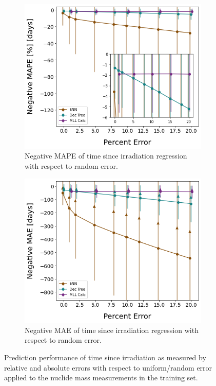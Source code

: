 \begin{figure}[!htb]
  \centering
  \begin{subfigure}[b]{0.49\textwidth}
    \centering
    \includegraphics[width=\textwidth]{./chapters/exp1/randerr_compare_nuc29_MAPE_cool.png}
    \caption{Negative \gls{MAPE} of time since irradiation regression with 
             respect to random error.} 
    \label{fig:coolmape}
  \end{subfigure}
  \hfill
  \begin{subfigure}[b]{0.49\textwidth}
    \centering
    \includegraphics[width=\textwidth]{./chapters/exp1/randerr_compare_nuc29_MAE_cool.png}
    \caption{Negative \gls{MAE} of time since irradiation regression with 
             respect to random error.} 
    \label{fig:coolmae}
  \end{subfigure}
  \caption[Prediction performance of time since irradiation regression with 
           increasing training set error]
          {Prediction performance of time since irradiation as measured by 
           relative and absolute errors with respect to uniform/random error 
           applied to the nuclide mass measurements in the training set.}
  \label{fig:randcool}
\end{figure}

